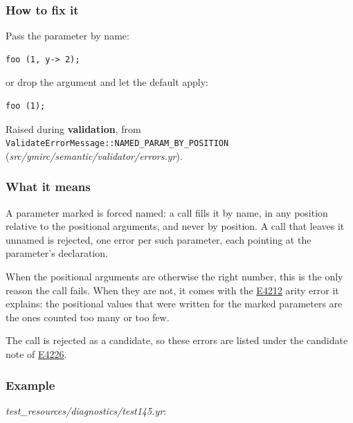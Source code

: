 \subsubsection*{How to fix it}

Pass the parameter by name:

\begin{lstlisting}[style=coloredverbatim]
foo (1, y-> 2);
\end{lstlisting}

or drop the argument and let the default apply:

\begin{lstlisting}[style=coloredverbatim]
foo (1);
\end{lstlisting}

\label{sec:codes:e4284}

Raised during \textbf{validation}, from \texttt{ValidateErrorMessage::\allowbreak{}NAMED\_\allowbreak{}PARAM\_\allowbreak{}BY\_\allowbreak{}POSITION} (\textit{src/\allowbreak{}ymirc/\allowbreak{}semantic/\allowbreak{}validator/\allowbreak{}errors.yr}).

\subsubsection*{What it means}

A parameter marked  is forced named: a call fills it by name, in any position relative to the positional arguments, and never by position. A call that leaves it unnamed is rejected, one error per such parameter, each pointing at the parameter's declaration.

When the positional arguments are otherwise the right number, this is the only reason the call fails. When they are not, it comes with the \hyperref[sec:codes:e4212]{E4212} arity error it explains: the positional values that were written for the marked parameters are the ones counted too many or too few.

The call is rejected as a candidate, so these errors are listed under the candidate note of \hyperref[sec:codes:e4226]{E4226}.

\subsubsection*{Example}

\textit{test\_\allowbreak{}resources/\allowbreak{}diagnostics/\allowbreak{}test145.yr}:

